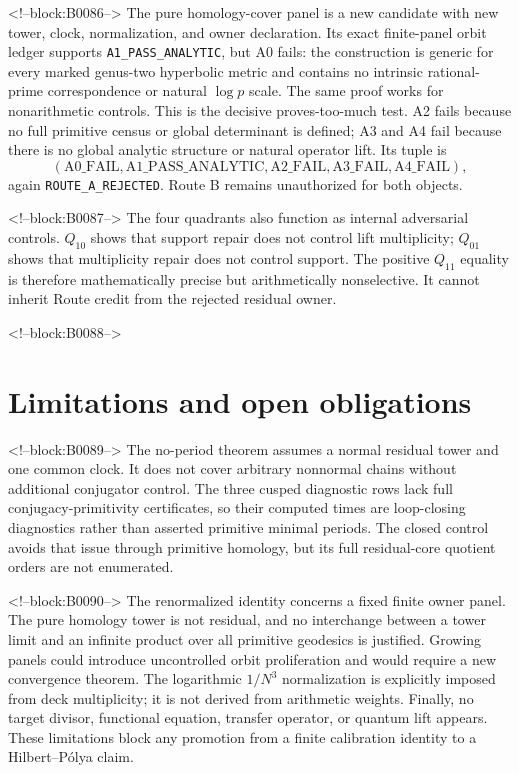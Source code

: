 \documentclass[11pt]{article}
\theoremstyle{definition}
\theoremstyle{remark}
\begin{document}
<!--block:B0086-->
The pure homology-cover panel is a new candidate with new tower, clock, normalization, and owner declaration. Its exact finite-panel orbit ledger supports \texttt{A1\_PASS\_ANALYTIC}, but A0 fails: the construction is generic for every marked genus-two hyperbolic metric and contains no intrinsic rational-prime correspondence or natural $\log p$ scale. The same proof works for nonarithmetic controls. This is the decisive proves-too-much test. A2 fails because no full primitive census or global determinant is defined; A3 and A4 fail because there is no global analytic structure or natural operator lift. Its tuple is
\[
(\mathrm{A0\_FAIL},\mathrm{A1\_PASS\_ANALYTIC},
\mathrm{A2\_FAIL},\mathrm{A3\_FAIL},\mathrm{A4\_FAIL}),
\]
again \texttt{ROUTE\_A\_REJECTED}. Route B remains unauthorized for both objects.

<!--block:B0087-->
The four quadrants also function as internal adversarial controls. $Q_{10}$ shows that support repair does not control lift multiplicity; $Q_{01}$ shows that multiplicity repair does not control support. The positive $Q_{11}$ equality is therefore mathematically precise but arithmetically nonselective. It cannot inherit Route credit from the rejected residual owner.

<!--block:B0088-->
\section{Limitations and open obligations}

<!--block:B0089-->
The no-period theorem assumes a normal residual tower and one common clock. It does not cover arbitrary nonnormal chains without additional conjugator control. The three cusped diagnostic rows lack full conjugacy-primitivity certificates, so their computed times are loop-closing diagnostics rather than asserted primitive minimal periods. The closed control avoids that issue through primitive homology, but its full residual-core quotient orders are not enumerated.

<!--block:B0090-->
The renormalized identity concerns a fixed finite owner panel. The pure homology tower is not residual, and no interchange between a tower limit and an infinite product over all primitive geodesics is justified. Growing panels could introduce uncontrolled orbit proliferation and would require a new convergence theorem. The logarithmic $1/N^3$ normalization is explicitly imposed from deck multiplicity; it is not derived from arithmetic weights. Finally, no target divisor, functional equation, transfer operator, or quantum lift appears. These limitations block any promotion from a finite calibration identity to a Hilbert--Pólya claim.
\end{document}
